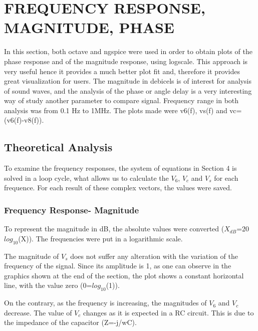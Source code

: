 
\section{FREQUENCY RESPONSE, MAGNITUDE, PHASE}
In this section, both octave and ngspice were used in order to obtain plots of the phase response and of the magnitude response, using logscale. This approach is very useful hence it provides a much better plot fit and, therefore it provides great visualization for users. The magnitude in debicels is of interest for analysis of sound waves, and the analysis of the phase or angle delay is a very interesting way of study another parameter to compare signal. Frequency range in both analysis was from 0.1 Hz to 1MHz. The plots made were v6(f), vs(f) and vc=(v6(f)-v8(f)).

\subsection{Theoretical Analysis}

To examine the frequency responses, the system of equations in Section 4 is solved in a loop cycle, what allows us to calculate the $V_6$, $V_c$ and $V_s$ for each frequence. For each result of these complex vectors, the values were saved.

\subsubsection{Frequency Response- Magnitude}

To represent the magnitude in dB, the absolute values were converted ($X_{dB}$=20$log_{10}$(X)). The frequencies were put in a logarithmic scale.

The magnitude of $V_s$ does not suffer any alteration with the variation of the frequency of the signal. Since its amplitude is 1, as one can observe in the graphics shown at the end of the section, the plot shows a constant horizontal line, with the value zero (0=$log_{10}$(1)).

On the contrary, as the frequency is increasing, the magnitudes of $V_6$ and $V_c$ decrease. The value of $V_c$ changes as it is expected in a RC circuit. This is due to the impedance of the capacitor (Z=-j/wC).

